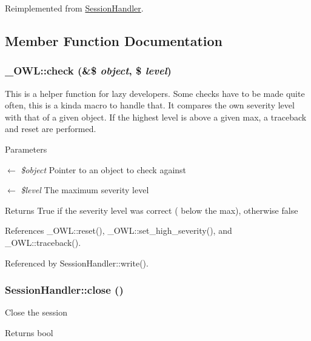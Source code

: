 Reimplemented from \hyperlink{classSessionHandler_a461097c3ee6b1aecf833ce1225d02329}{SessionHandler}.



\subsection{Member Function Documentation}
\subsubsection[{check}]{\setlength{\rightskip}{0pt plus 5cm}\_\-OWL::check (\&\$ {\em object}, \/  \$ {\em level})}\label{class__OWL_ad6f4f6946f40199dd0333cf219fa500e}
This is a helper function for lazy developers. Some checks have to be made quite often, this is a kinda macro to handle that. It compares the own severity level with that of a given object. If the highest level is above a given max, a traceback and reset are performed.


\begin{DoxyParams}{Parameters}
\item[\mbox{$\leftarrow$} {\em \$object}]Pointer to an object to check against \item[\mbox{$\leftarrow$} {\em \$level}]The maximum severity level \end{DoxyParams}
\begin{DoxyReturn}{Returns}
True if the severity level was correct ( below the max), otherwise false 
\end{DoxyReturn}


References \_\-OWL::reset(), \_\-OWL::set\_\-high\_\-severity(), and \_\-OWL::traceback().



Referenced by SessionHandler::write().

\subsubsection[{close}]{\setlength{\rightskip}{0pt plus 5cm}SessionHandler::close ()}\label{classSessionHandler_a335ced83731c7e3e685b7e0df2989c79}
Close the session

\begin{DoxyReturn}{Returns}
bool 
\end{DoxyReturn}
